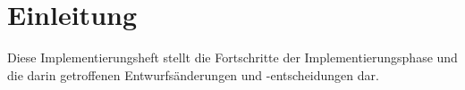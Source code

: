 \section{Einleitung}
Diese Implementierungsheft stellt die Fortschritte der Implementierungsphase und die darin getroffenen Entwurfsänderungen 
und -entscheidungen dar.
